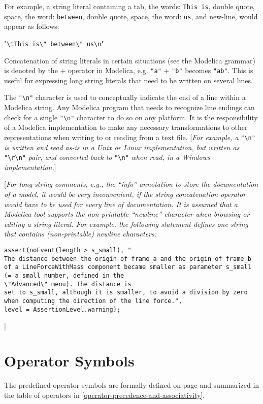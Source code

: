 For example, a string literal containing a tab, the words: \lstinline[basicstyle=\ttfamily]!This is!,
double quote, space, the word: \lstinline[basicstyle=\ttfamily]!between!, double quote, space, the word:
\lstinline[basicstyle=\ttfamily]!us!, and new-line, would appear as follows:

"\lstinline[basicstyle=\ttfamily]!\tThis is\" between\" us\n!"

Concatenation of string literals in certain situations (see the Modelica
grammar) is denoted by the + operator in Modelica, e.g. \lstinline[basicstyle=\ttfamily]!"a"! + \lstinline[basicstyle=\ttfamily]!"b"!
becomes \lstinline[basicstyle=\ttfamily]!"ab"!. This is useful for expressing long string literals that
need to be written on several lines.

The \lstinline[basicstyle=\ttfamily]!"\n"! character is used to conceptually indicate the
end of a line within a Modelica string. Any Modelica program that needs
to recognize line endings can check for a single 
\lstinline[basicstyle=\ttfamily]!"\n"!
character to do so on any platform. It is the responsibility of a
Modelica implementation to make any necessary transformations to other
representations when writing to or reading from a text file.
{[}\emph{For example, a} \lstinline[basicstyle=\ttfamily]!"\n"! \emph{is written and read as-is in
a Unix or Linux implementation, but written as}
\lstinline[basicstyle=\ttfamily]!"\r\n"! \emph{pair, and converted back to}
\lstinline[basicstyle=\ttfamily]!"\n"! \emph{when read, in a Windows implementation.}{]}

{[}\emph{For long string comments, e.g., the ``info'' annotation to
store the documentation of a model, it would be very inconvenient, if
the string concatenation operator would have to be used for every line
of documentation. It is assumed that a Modelica tool supports the
non-printable ``newline'' character when browsing or editing a string
literal. For example, the following statement defines one string that
contains (non-printable) newline characters:}

\begin{lstlisting}[language=modelica]
assert(noEvent(length > s_small), "
The distance between the origin of frame_a and the origin of frame_b
of a LineForceWithMass component became smaller as parameter s_small
(= a small number, defined in the
\"Advanced\" menu). The distance is
set to s_small, although it is smaller, to avoid a division by zero
when computing the direction of the line force.",
level = AssertionLevel.warning);
\end{lstlisting}
]
\section{Operator Symbols}

The predefined operator symbols are formally defined on page \pageref{lexical-conventions} and
summarized in the table of operators in \autoref{operator-precedence-and-associativity}.
